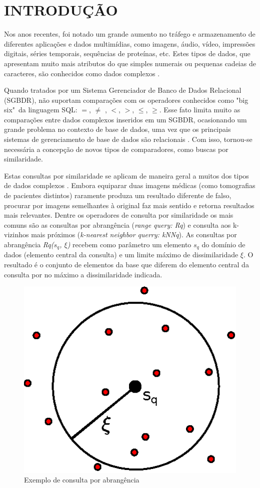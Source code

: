 

\chapter{INTRODUÇÃO}
\label{chap:introducao}
Nos anos recentes, foi notado um grande aumento no tráfego e armazenamento de diferentes aplicações e dados multimídias, como imagens, áudio, vídeo, impressões digitais, séries temporais,
sequências de proteínas, etc. Estes tipos de dados, que apresentam muito mais atributos do que simples numerais ou pequenas cadeias de caracteres, são conhecidos como dados complexos \cite{Zighed2008}.\par
Quando tratados por um Sistema Gerenciador de Banco de Dados Relacional (SGBDR), não suportam comparações com os operadores conhecidos como "big six"\ da linguagem SQL: $=$, $\neq$ , $<$, $>$, $\leq$, $\geq$.
Esse fato limita muito as comparações entre dados complexos inseridos em um SGBDR, ocasionando um grande problema no contexto de base de dados, uma vez que os principais sistemas de gerenciamento
de base de dados são relacionais \cite{DBE2017}. Com isso, tornou-se necessária a concepção de novos tipos de comparadores, como buscas por similaridade.\par 

Estas consultas por similaridade se aplicam de maneira geral a muitos dos tipos de dados complexos \cite{Barioni2009}. Embora equiparar duas imagens médicas (como tomografias de pacientes distintos) 
raramente produza um resultado diferente de falso, procurar por imagens semelhantes à original faz mais sentido e retorna resultados mais relevantes. Dentre os operadores de consulta por similaridade
os mais comuns são as consultas por abrangência (\textit{range query: Rq}) e consulta aos k-vizinhos mais próximos (\textit{k-nearest neighbor querry: kNNq}). As consultas por abrangência \textit{Rq($s_q$, $\xi$)}
recebem como parâmetro um elemento $s_q$ do domínio de dados (elemento central da consulta) e um limite máximo de dissimilaridade $\xi$. O resultado é o conjunto de elementos da base que diferem do elemento
central da consulta por no máximo a dissimilaridade indicada.\par

\begin{figure}[ht]
\centering
\captionsetup{width=0.50\textwidth, font=footnotesize, textfont=bf}
\includegraphics[width=.3\textwidth]{dados/figuras/rq.eps}
\caption{Exemplo de consulta por abrangência}
\label{fig:exemplorq}
\end{figure}


